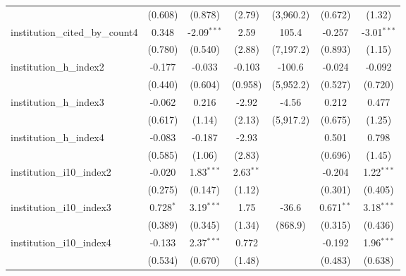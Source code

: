 \begin{tabular}{lcccccc}
                                         & (0.608)        & (0.878)       & (2.79)        & (3,960.2)  & (0.672)       & (1.32)\\   
   institution\_cited\_by\_count4        & 0.348          & -2.09$^{***}$ & 2.59          & 105.4      & -0.257        & -3.01$^{***}$\\   
                                         & (0.780)        & (0.540)       & (2.88)        & (7,197.2)  & (0.893)       & (1.15)\\   
   institution\_h\_index2                & -0.177         & -0.033        & -0.103        & -100.6     & -0.024        & -0.092\\   
                                         & (0.440)        & (0.604)       & (0.958)       & (5,952.2)  & (0.527)       & (0.720)\\   
   institution\_h\_index3                & -0.062         & 0.216         & -2.92         & -4.56      & 0.212         & 0.477\\   
                                         & (0.617)        & (1.14)        & (2.13)        & (5,917.2)  & (0.675)       & (1.25)\\   
   institution\_h\_index4                & -0.083         & -0.187        & -2.93         &            & 0.501         & 0.798\\   
                                         & (0.585)        & (1.06)        & (2.83)        &            & (0.696)       & (1.45)\\   
   institution\_i10\_index2              & -0.020         & 1.83$^{***}$  & 2.63$^{**}$   &            & -0.204        & 1.22$^{***}$\\   
                                         & (0.275)        & (0.147)       & (1.12)        &            & (0.301)       & (0.405)\\   
   institution\_i10\_index3              & 0.728$^{*}$    & 3.19$^{***}$  & 1.75          & -36.6      & 0.671$^{**}$  & 3.18$^{***}$\\   
                                         & (0.389)        & (0.345)       & (1.34)        & (868.9)    & (0.315)       & (0.436)\\   
   institution\_i10\_index4              & -0.133         & 2.37$^{***}$  & 0.772         &            & -0.192        & 1.96$^{***}$\\   
                                         & (0.534)        & (0.670)       & (1.48)        &            & (0.483)       & (0.638)\\   

\end{tabular}
